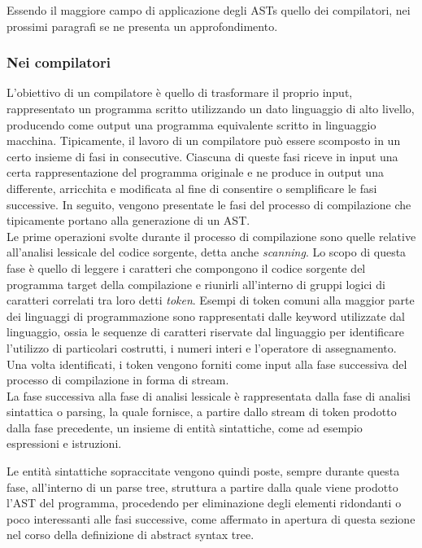 Essendo il maggiore campo di applicazione degli ASTs quello dei compilatori, nei
prossimi paragrafi se ne presenta un approfondimento.

\subsubsection{Nei compilatori}

L'obiettivo di un compilatore è quello di trasformare il proprio input,
rappresentato un programma scritto utilizzando un dato linguaggio di alto
livello, producendo come output una programma equivalente scritto in linguaggio
macchina. Tipicamente, il lavoro di un compilatore può essere scomposto in un
certo insieme di fasi in consecutive. Ciascuna di queste fasi riceve in input
una certa rappresentazione del programma originale e ne produce in output una
differente, arricchita e modificata al fine di consentire o semplificare le fasi
successive. In seguito, vengono presentate le fasi del processo di compilazione
che tipicamente portano alla generazione di un AST.\\

Le prime operazioni svolte durante il processo di compilazione sono quelle
relative all’analisi lessicale del codice sorgente, detta anche
\textit{scanning}. Lo scopo di questa fase è quello di leggere i caratteri che
compongono il codice sorgente del programma target della compilazione e riunirli
all’interno di gruppi logici di caratteri correlati tra loro detti
\textit{token}. Esempi di token comuni alla maggior parte dei linguaggi di
programmazione sono rappresentati dalle keyword utilizzate dal linguaggio, ossia
le sequenze di caratteri riservate dal linguaggio per identificare l'utilizzo di
particolari costrutti, i numeri interi e l’operatore di assegnamento. Una volta
identificati, i token vengono forniti come input alla fase successiva del
processo di compilazione in forma di stream.\\

La fase successiva alla fase di analisi lessicale è rappresentata dalla fase di
analisi sintattica o parsing, la quale fornisce, a partire dallo stream di token
prodotto dalla fase precedente, un insieme di entità sintattiche, come ad
esempio espressioni e istruzioni.

Le entità sintattiche sopraccitate vengono quindi poste, sempre durante questa
fase, all’interno di un parse tree, struttura a partire dalla quale viene
prodotto l’AST del programma, procedendo per eliminazione degli elementi
ridondanti o poco interessanti alle fasi successive, come affermato in apertura
di questa sezione nel corso della definizione di abstract syntax tree.

